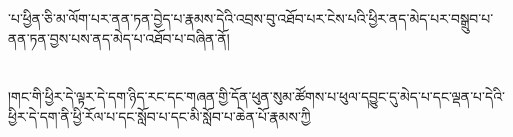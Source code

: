 ་པ་ཕྱིན་ཅི་མ་ལོག་པར་ནན་ཏན་བྱེད་པ་རྣམས་དེའི་འབྲས་བུ་འཐོབ་པར་ངེས་པའི་ཕྱིར་ནད་མེད་པར་བསྒྲུབ་པ་ནན་ཏན་བྱས་པས་ནད་མེད་པ་འཐོབ་པ་བཞིན་ནོ།\chapter{ }།གང་གི་ཕྱིར་དེ་ལྟར་དེ་དག་ཉིད་རང་དང་གཞན་གྱི་དོན་ཕུན་སུམ་ཚོགས་པ་ཕུལ་དབྱུང་དུ་མེད་པ་དང་ལྡན་པ་དེའི་ཕྱིར་དེ་དག་ནི་ཕྱི་རོལ་པ་དང་སློབ་པ་དང་མི་སློབ་པ་ཆེན་པོ་རྣམས་ཀྱི